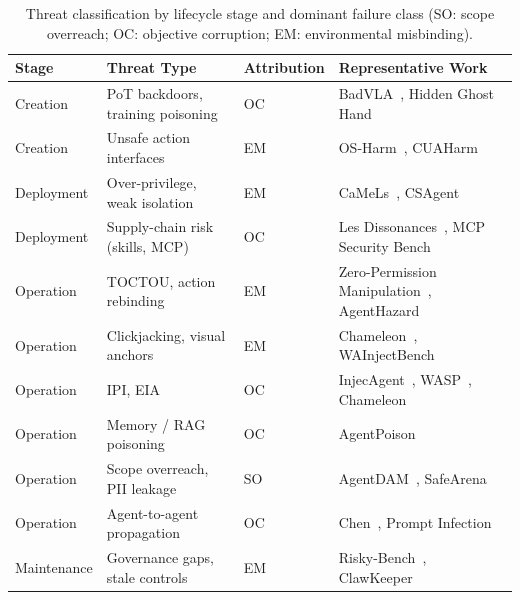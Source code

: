 \begin{table}[!t]
\centering
\scriptsize
\caption{Threat classification by lifecycle stage and dominant failure class (SO: scope overreach; OC: objective corruption; EM: environmental misbinding).}
\label{tab:cua_threats}
\setlength{\tabcolsep}{4pt}
\renewcommand{\arraystretch}{1.08}
\begin{tabular}{>{\raggedright\arraybackslash}p{1.7cm}
                >{\raggedright\arraybackslash}p{3.95cm}
                >{\raggedright\arraybackslash}p{1.35cm}
                >{\raggedright\arraybackslash}p{8.0cm}}
\toprule
\textbf{Stage} & \textbf{Threat Type} & \textbf{Attribution} & \textbf{Representative Work} \\
\midrule
Creation & PoT backdoors, training poisoning & OC & BadVLA~\cite{zhou2025badvla}, Hidden Ghost Hand~\cite{cheng2025hidden} \\
Creation & Unsafe action interfaces & EM & OS-Harm~\cite{kuntz2025harm}, CUAHarm~\cite{tian2025measuring} \\
Deployment & Over-privilege, weak isolation & EM & CaMeLs~\cite{foerster2026camels}, CSAgent~\cite{gong2025secure} \\
Deployment & Supply-chain risk (skills, MCP) & OC & Les Dissonances~\cite{li2025dissonances}, MCP Security Bench~\cite{zhang2025mcp} \\
Operation & TOCTOU, action rebinding & EM & Zero-Permission Manipulation~\cite{qian2026zero}, AgentHazard~\cite{liu2025hijacking} \\
Operation & Clickjacking, visual anchors & EM & Chameleon~\cite{zhang2026realistic}, WAInjectBench~\cite{liu2025wainjectbench} \\
Operation & IPI, EIA & OC & InjecAgent~\cite{zhan2024injecagent}, WASP~\cite{evtimov2025wasp}, Chameleon~\cite{zhang2026realistic} \\
Operation & Memory / RAG poisoning & OC & AgentPoison~\cite{chen2024agentpoison} \\
Operation & Scope overreach, PII leakage & SO & AgentDAM~\cite{zharmagambetov2025agentdam}, SafeArena~\cite{tur2025safearena} \\
Operation & Agent-to-agent propagation & OC & Chen~\cite{chen2026openclaw}, Prompt Infection~\cite{lee2024prompt} \\
Maintenance & Governance gaps, stale controls & EM & Risky-Bench~\cite{zheng2026riskybench}, ClawKeeper~\cite{liu2026clawkeeper} \\
\bottomrule
\end{tabular}
\end{table}

